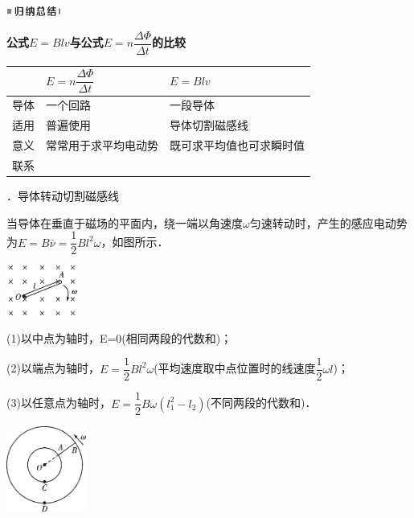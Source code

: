 \begin{center}\includegraphics[width=0.70764in,height=0.12292in]{media/image13.png}\end{center}
\begin{center}
	\textbf{公式$E=Blv$与公式$E=n \dfrac{\Delta \Phi}{\Delta t}$的比较}
\end{center}

\begin{longtable}[]{@{}m{1cm}m{6cm}m{5cm}@{}}
\toprule
& $E=n \dfrac{\Delta \Phi}{\Delta t}$ & $E=Blv$\tabularnewline
\midrule
\endhead
导体 & 一个回路 & 一段导体\tabularnewline
适用 & 普遍使用 & 导体切割磁感线\tabularnewline
意义 & 常常用于求平均电动势&既可求平均值也可求瞬时值\tabularnewline
联系 & \tabularnewline
\bottomrule
\end{longtable}

．导体转动切割磁感线

当导体在垂直于磁场的平面内，绕一端以角速度$\omega$匀速转动时，产生的感应电动势为$E=B \bar{\nu}=\dfrac{1}{2} B l^{2} \omega$，如图所示．

\begin{center}\includegraphics[width=0.91528in,height=0.64167in]{media/image413.png}\end{center}

(1)以中点为轴时，E=0(相同两段的代数和)；

(2)以端点为轴时，$E=\dfrac{1}{2} B l^{2} \omega$(平均速度取中点位置时的线速度$\dfrac{1}{2}\omega l$)；

(3)以任意点为轴时，$E=\dfrac{1}{2} B \omega\left(l_{1}^{2}-l_{2}\right)$(不同两段的代数和)．

\begin{center}\includegraphics[width=1.0375in,height=1.10347in]{media/image414.png}\end{center}


